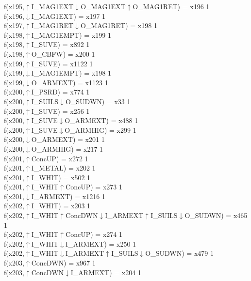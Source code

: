 f(x195,$\uparrow$I\_MAG1EXT$\downarrow$O\_MAG1EXT$\uparrow$O\_MAG1RET) = x196 {1} \\
f(x196,$\downarrow$I\_MAG1EXT) = x197 {1} \\
f(x197,$\uparrow$I\_MAG1RET$\downarrow$O\_MAG1RET) = x198 {1} \\
f(x198,$\uparrow$I\_MAG1EMPT) = x199 {1} \\
f(x198,$\uparrow$I\_SUVE) = x892 {1} \\
f(x198,$\uparrow$O\_CBFW) = x200 {1} \\
f(x199,$\uparrow$I\_SUVE) = x1122 {1} \\
f(x199,$\downarrow$I\_MAG1EMPT) = x198 {1} \\
f(x199,$\downarrow$O\_ARMEXT) = x1123 {1} \\
f(x200,$\uparrow$I\_PSRD) = x774 {1} \\
f(x200,$\uparrow$I\_SUILS$\downarrow$O\_SUDWN) = x33 {1} \\
f(x200,$\uparrow$I\_SUVE) = x256 {1} \\
f(x200,$\uparrow$I\_SUVE$\downarrow$O\_ARMEXT) = x488 {1} \\
f(x200,$\uparrow$I\_SUVE$\downarrow$O\_ARMHIG) = x299 {1} \\
f(x200,$\downarrow$O\_ARMEXT) = x201 {1} \\
f(x200,$\downarrow$O\_ARMHIG) = x217 {1} \\
f(x201,$\uparrow$ConcUP) = x272 {1} \\
f(x201,$\uparrow$I\_METAL) = x202 {1} \\
f(x201,$\uparrow$I\_WHIT) = x502 {1} \\
f(x201,$\uparrow$I\_WHIT$\uparrow$ConcUP) = x273 {1} \\
f(x201,$\downarrow$I\_ARMEXT) = x1216 {1} \\
f(x202,$\uparrow$I\_WHIT) = x203 {1} \\
f(x202,$\uparrow$I\_WHIT$\uparrow$ConcDWN$\downarrow$I\_ARMEXT$\uparrow$I\_SUILS$\downarrow$O\_SUDWN) = x465 {1} \\
f(x202,$\uparrow$I\_WHIT$\uparrow$ConcUP) = x274 {1} \\
f(x202,$\uparrow$I\_WHIT$\downarrow$I\_ARMEXT) = x250 {1} \\
f(x202,$\uparrow$I\_WHIT$\downarrow$I\_ARMEXT$\uparrow$I\_SUILS$\downarrow$O\_SUDWN) = x479 {1} \\
f(x203,$\uparrow$ConcDWN) = x967 {1} \\
f(x203,$\uparrow$ConcDWN$\downarrow$I\_ARMEXT) = x204 {1} \\
